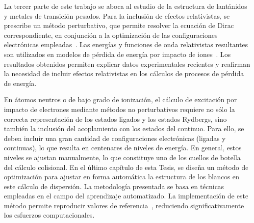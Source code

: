 La tercer parte de este trabajo se aboca al estudio de la estructura de 
lantánidos y metales de transición pesados. Para la inclusión de efectos 
relativistas, se prescribe un método perturbativo, que permite resolver 
la ecuación de Dirac correspondiente, en conjunción a la optimización de 
las configuraciones electrónicas empleadas~\cite{Mendez:19relat}. Las 
energías y funciones de onda relativistas resultantes son 
utilizados en modelos de pérdida de energía por impacto de 
iones~\cite{Montanari:20}. 
Los resultados obtenidos permiten explicar datos experimentales 
recientes y reafirman la necesidad de incluir efectos relativistas en 
los cálculos de procesos de pérdida de energía. 

En átomos neutros o de bajo grado de ionización, el cálculo de 
excitación por impacto de electrones mediante métodos no perturbativos 
requiere no sólo la correcta representación de los estados ligados y los 
estados Rydbergs, sino también la inclusión del acoplamiento con los 
estados del continuo. Para ello, se deben incluir una gran cantidad de 
configuraciones electrónicas (ligadas y continuas), lo que resulta en 
centenares de niveles de energía. En general, estos niveles se ajustan 
manualmente, lo que constituye uno de los cuellos de botella del cálculo 
colisional. En el último capítulo de esta Tesis, se diseña un método de 
optimización para ajustar en forma automática la estructura de los 
blancos en este cálculo de dispersión. La metodología presentada se 
basa en técnicas empleadas en el campo del aprendizaje automatizado. La 
implementación de este método permite reproducir valores de 
referencia~\cite{Mendez:20baye,Mendez:prep}, reduciendo 
significativamente los esfuerzos computacionales. 



